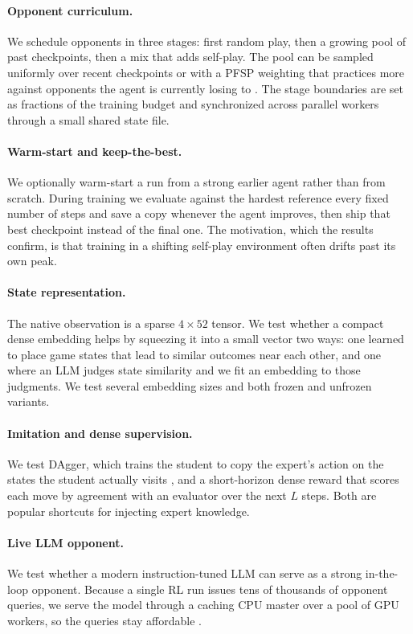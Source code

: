 \documentclass[letterpaper]{article} %
\begin{document}
\paragraph{Opponent curriculum.}
We schedule opponents in three stages: first random play, then a growing pool of
past checkpoints, then a mix that adds self-play. The pool can be sampled
uniformly over recent checkpoints or with a PFSP weighting that practices more
against opponents the agent is currently losing to \citep{alphastar}. The stage
boundaries are set as fractions of the training budget and synchronized across
parallel workers through a small shared state file.

\paragraph{Warm-start and keep-the-best.}
We optionally warm-start a run from a strong earlier agent rather than from
scratch. During training we evaluate against the hardest reference every fixed
number of steps and save a copy whenever the agent improves, then ship that best
checkpoint instead of the final one. The motivation, which the results confirm,
is that training in a shifting self-play environment often drifts past its own
peak.

\paragraph{State representation.}
The native observation is a sparse $4\times52$ tensor. We test whether a compact
dense embedding helps by squeezing it into a small vector two ways: one learned
to place game states that lead to similar outcomes near each other, and one
where an LLM judges state similarity and we fit an embedding to those judgments.
We test several embedding sizes and both frozen and unfrozen variants.

\paragraph{Imitation and dense supervision.}
We test DAgger, which trains the student to copy the expert's action on the
states the student actually visits \citep{dagger}, and a short-horizon dense
reward that scores each move by agreement with an evaluator over the next $L$
steps. Both are popular shortcuts for injecting expert knowledge.

\paragraph{Live LLM opponent.}
We test whether a modern instruction-tuned LLM can serve as a strong in-the-loop
opponent. Because a single RL run issues tens of thousands of opponent queries, we
serve the model through a caching CPU master over a pool of GPU workers, so the
queries stay affordable \citep{vllm,qwen}.
\end{document}
